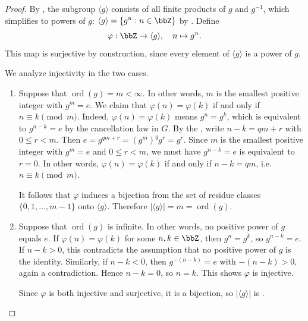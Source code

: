 \begin{proof}
    By , the subgroup $\langle g \rangle$ consists of all finite products of $g$ and $g^{-1}$, which simplifies to powers of $g$: $\langle g \rangle = \{g^n : n \in \bbZ\}$ by . Define
    $$\varphi : \bbZ \to \langle g \rangle, \quad n \mapsto g^n.$$
    This map is surjective by construction, since every element of $\langle g \rangle$ is a power of $g$.

    We analyze injectivity in the two cases.
    \begin{enumerate}
        \item Suppose that $\operatorname{ord}(g) = m < \infty$. In other words, $m$ is the smallest positive integer with $g^m = e$. We claim that $\varphi(n) = \varphi(k)$ if and only if $n \equiv k \pmod{m}$. Indeed, $\varphi(n) = \varphi(k)$ means $g^n = g^k$, which is equivalent to $g^{n-k} = e$ by the cancellation law in $G$. By the , write $n - k = qm + r$ with $0 \leq r < m$. Then $e = g^{qm+r} = (g^m)^q g^r = g^r$. Since $m$ is the smallest positive integer with $g^m = e$ and $0 \leq r < m$, we must have $g^{n-k} = e$ is equivalent to $r = 0$. In other words, $\varphi(n) = \varphi(k)$ if and only if $n-k = qm$, i.e. $n \equiv k \pmod{m}$.

        It follows that $\varphi$ induces a bijection from the set of residue classes $\{0, 1, \dots, m-1\}$ onto $\langle g \rangle$. Therefore $|\langle g \rangle| = m = \operatorname{ord}(g)$.

        \item Suppose that $\operatorname{ord}(g)$ is infinite. In other words, no positive power of $g$ equals $e$. If $\varphi(n) = \varphi(k)$ for some $n, k \in \bbZ$, then $g^n = g^k$, so $g^{n-k} = e$. If $n - k > 0$, this contradicts the assumption that no positive power of $g$ is the identity. Similarly, if $n - k < 0$, then $g^{-(n-k)} = e$ with $-(n-k) > 0$, again a contradiction. Hence $n - k = 0$, so $n = k$. This shows $\varphi$ is injective.

        Since $\varphi$ is both injective and surjective, it is a bijection, so $|\langle g \rangle|$ is .
    \end{enumerate}
\end{proof}
